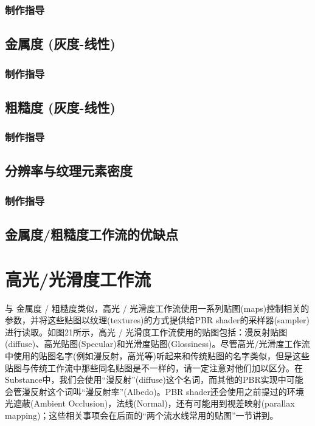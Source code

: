 \subsubsection{制作指导}

\subsection{金属度 (灰度-线性)}

\subsubsection{制作指导}

\subsection{粗糙度 (灰度-线性)}

\subsubsection{制作指导}

\subsection{分辨率与纹理元素密度}

\subsubsection{制作指导}

\subsection{金属度/粗糙度工作流的优缺点}

\section{高光/光滑度工作流}

与 金属度 / 粗糙度类似，高光 / 光滑度工作流使用一系列贴图(maps)控制相关的参数，并将这些贴图以纹理(textures)的方式提供给PBR shader的采样器(sampler)进行读取。如图21所示，高光 / 光滑度工作流使用的贴图包括：漫反射贴图(diffuse)、高光贴图(Specular)和光滑度贴图(Glossiness)。尽管高光/光滑度工作流中使用的贴图名字(例如漫反射，高光等)听起来和传统贴图的名字类似，但是这些贴图与传统工作流中那些同名贴图是不一样的，请一定注意对他们加以区分。在Substance中，我们会使用“漫反射”(diffuse)这个名词，而其他的PBR实现中可能会管漫反射这个词叫“漫反射率”(Albedo)。PBR shader还会使用之前提过的环境光遮蔽(Ambient Occlusion)，法线(Normal)，还有可能用到视差映射(parallax mapping)；这些相关事项会在后面的“两个流水线常用的贴图”一节讲到。


